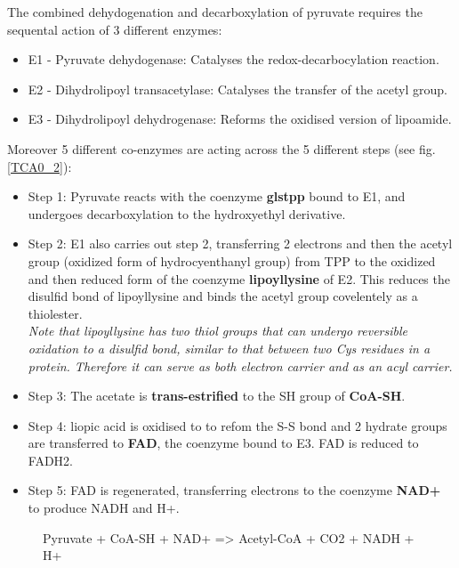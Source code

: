 \documentclass[../main.tex]{subfiles}
\begin{document}
The combined dehydogenation and decarboxylation of pyruvate requires the sequental action of 3 different enzymes:  
\begin{itemize}
	\item E1 - Pyruvate dehydogenase: Catalyses the redox-decarbocylation reaction. 
	\item E2 - Dihydrolipoyl transacetylase: Catalyses the transfer of the acetyl group.
	\item E3 - Dihydrolipoyl dehydrogenase: Reforms the oxidised version of lipoamide. 
\end{itemize}
\noindent
Moreover 5 different co-enzymes are acting across the 5 different steps (see fig. \ref{TCA0_2}): 
\begin{itemize}
	\item Step 1: Pyruvate reacts with the coenzyme \textbf{gls{tpp}}  bound to E1, and undergoes decarboxylation to the hydroxyethyl derivative.    
	\item Step 2: E1 also carries out step 2, transferring 2 electrons and then the acetyl group (oxidized form of hydrocyenthanyl group) from TPP to the oxidized and then reduced form of the coenzyme \textbf{\gls{lipoyllysine}} of E2. This reduces the disulfid bond of lipoyllysine and binds the acetyl group covelentely as a thiolester. \\
	\textit{Note that lipoyllysine has two thiol groups that can undergo reversible oxidation to a disulfid bond, similar to that between two Cys residues in a protein. Therefore it can serve as both electron carrier and as an acyl carrier.}
	\item Step 3: The acetate is \textbf{trans-estrified} to the SH group of \textbf{CoA-SH}. 
	\item Step 4: liopic acid is oxidised to to refom the S-S bond and 2 hydrate groups are transferred to \textbf{FAD}, the coenzyme bound to E3. FAD is reduced to FADH2. 
	\item Step 5: FAD is regenerated, transferring electrons to the coenzyme \textbf{NAD+} to produce NADH and H+. 
\end{itemize}  
\begin{figure}[H]
	\centering
	\caption{Pyruvate + CoA-SH + NAD+ => Acetyl-CoA + CO2 + NADH + H+}
\end{figure}
\end{document}
